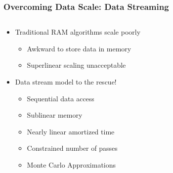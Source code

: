 \documentclass{beamer}
\begin{document}
\begin{frame}
\frametitle{Overcoming Data Scale: Data Streaming}


\begin{columns}
\begin{column}{0.55\textwidth}
	\begin{itemize}
		\item Traditional RAM algorithms scale poorly
		\begin{itemize}
			\item Awkward to store data in memory
			\item Superlinear scaling unacceptable
		\end{itemize}
		\item Data stream model to the rescue!
		\begin{itemize}
			\item Sequential data access
			\item Sublinear memory
			\item Nearly linear amortized time
			\item Constrained number of passes
			\item Monte Carlo Approximations
		\end{itemize}
	\end{itemize}
\end{column}
\begin{column}{0.45\textwidth}  %
\begin{center}

\end{center}
\end{column}
\end{columns}
\end{frame}
\end{document}
